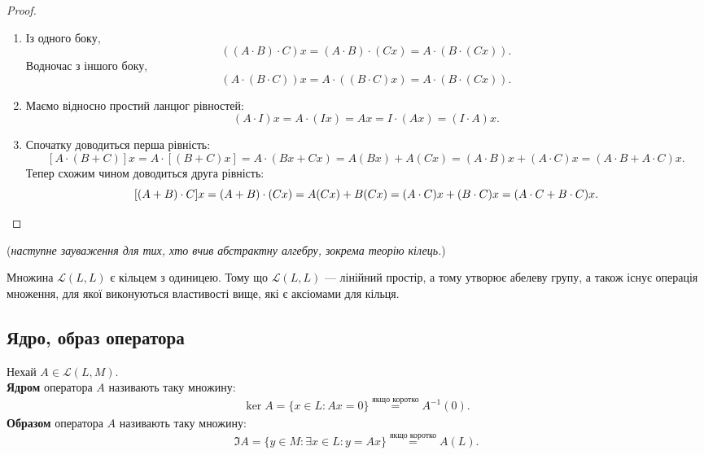 \documentclass{math_library}
\begin{document}
	\begin{proof}
	\begin{enumerate}[nosep, wide=0pt, label={\arabic*)}]
	\item Із одного боку,
	\[
	((A \cdot B) \cdot C) x = (A \cdot B) \cdot (Cx) = A \cdot (B \cdot (Cx)).
	\]
	Водночас з іншого боку,
	\[
	(A \cdot (B \cdot C)) x = A \cdot ( (B \cdot C) x) = A \cdot (B \cdot (Cx)).
	\]
	
	\item Маємо відносно простий ланцюг рівностей:
	\[
	(A \cdot I) x = A \cdot (Ix) = A x = I \cdot (A x) = (I \cdot A) x.
	\]

	\item Спочатку доводиться перша рівність:
	\[
	[A \cdot (B + C)]x = A \cdot [(B+C)x] = A \cdot (Bx + Cx) = A (Bx) + A (Cx) = (A \cdot B)x + (A \cdot C)x = (A \cdot B + A \cdot C)x.
	\]
	Тепер схожим чином доводиться друга рівність:
	\[
	[(A+B) \cdot C]x = (A+B) \cdot (Cx) = A (Cx) + B (Cx) = (A \cdot C)x + (B \cdot C)x = (A \cdot C + B \cdot C)x. \qedhere
	\]
	\end{enumerate}
	\end{proof}
	
	(\textit{наступне зауваження для тих, хто вчив абстрактну алгебру, зокрема теорію кілець.})
	
	\begin{remark}
	Множина $\mathcal{L}(L,L)$ є кільцем з одиницею. Тому що $\mathcal{L}(L,L)$ --- лінійний простір, а тому утворює абелеву групу, а також існує операція множення, для якої виконуються властивості вище, які є аксіомами для кільця.
	\end{remark}
	
	\subsection{Ядро, образ оператора}	
	\begin{definition}
	Нехай $A \in \mathcal{L}(L,M)$.\\
	\textbf{Ядром} оператора $A$ називають таку множину:
	\begin{align*}
	\ker A = \{x \in L: Ax = 0\} \overset{\text{якщо коротко}}{=} A^{-1}(0).
	\end{align*}
	\textbf{Образом} оператора $A$ називають таку множину:
	\begin{align*}
	\Im A = \{y \in M: \exists x \in L: y = Ax\} \overset{\text{якщо коротко}}{=} A(L).
	\end{align*}
	\end{definition}
	
\end{document}

